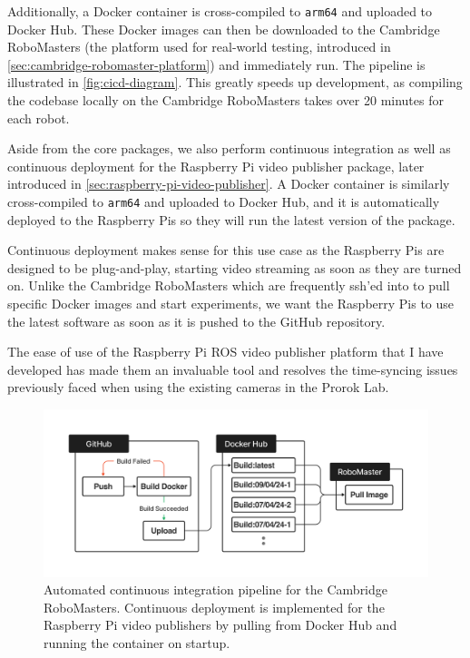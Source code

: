 Additionally, a Docker container is cross-compiled to \texttt{arm64} and uploaded to Docker Hub. These Docker images can then be downloaded to the Cambridge RoboMasters (the platform used for real-world testing, introduced in \autoref{sec:cambridge-robomaster-platform}) and immediately run. The pipeline is illustrated in \autoref{fig:cicd-diagram}. This greatly speeds up development, as compiling the codebase locally on the Cambridge RoboMasters takes over 20 minutes for each robot.

Aside from the core packages, we also perform continuous integration as well as continuous deployment for the Raspberry Pi video publisher package, later introduced in \autoref{sec:raspberry-pi-video-publisher}. A Docker container is similarly cross-compiled to \texttt{arm64} and uploaded to Docker Hub, and it is automatically deployed to the Raspberry Pis so they will run the latest version of the package.

Continuous deployment makes sense for this use case as the Raspberry Pis are designed to be plug-and-play, starting video streaming as soon as they are turned on. Unlike the Cambridge RoboMasters which are frequently ssh'ed into to pull specific Docker images and start experiments, we want the Raspberry Pis to use the latest software as soon as it is pushed to the GitHub repository.

The ease of use of the Raspberry Pi ROS video publisher platform that I have developed has made them an invaluable tool and resolves the time-syncing issues previously faced when using the existing cameras in the Prorok Lab.

\begin{figure}[h]
    \centering
    \includegraphics[trim=5cm 5cm 5cm 5cm, scale=0.2]{figures/cicd_diagram.pdf}

    \caption{Automated continuous integration pipeline for the Cambridge RoboMasters. Continuous deployment is implemented for the Raspberry Pi video publishers by pulling from Docker Hub and running the container on startup.}
    \label{fig:cicd-diagram}
\end{figure}


